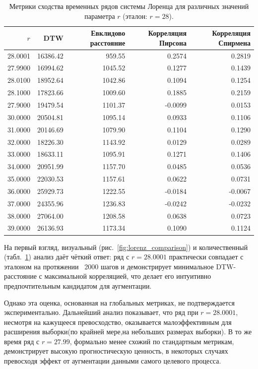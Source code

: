 \begin{table}[htbp]
\centering
\caption{Метрики сходства временных рядов системы Лоренца для различных значений параметра \(r\) (эталон: \(r=28\)).}
\label{tab:lorenz_metrics}
\begin{tabular}{|r|r|r|r|r|}
\hline
\(r\) & DTW & Евклидово расстояние & Корреляция Пирсона & Корреляция Спирмена \\
\hline
28.0001 & 16386.42 & 959.55 & 0.2574 & 0.2819 \\
\hline
27.9900 & 16994.62 & 1045.52 & 0.1277 & 0.1439 \\
\hline
28.0100 & 18952.64 & 1042.86 & 0.1094 & 0.1254 \\
\hline
28.1000 & 17823.66 & 1009.60 & 0.1885 & 0.2159 \\
\hline
27.9000 & 19479.54 & 1101.37 & -0.0099 & 0.0153 \\
\hline
30.0000 & 20504.81 & 1095.14 & 0.0933 & 0.1106 \\
\hline
31.0000 & 20146.69 & 1079.90 & 0.1104 & 0.1290 \\
\hline
32.0000 & 18226.30 & 1143.92 & 0.0129 & 0.0289 \\
\hline
33.0000 & 18633.11 & 1095.91 & 0.1271 & 0.1406 \\
\hline
34.0000 & 20951.99 & 1157.70 & 0.0485 & 0.0536 \\
\hline
35.0000 & 22030.53 & 1157.61 & 0.0622 & 0.0731 \\
\hline
36.0000 & 25929.73 & 1222.55 & -0.0184 & -0.0067 \\
\hline
37.0000 & 24355.96 & 1236.83 & -0.0242 & -0.0232 \\
\hline
38.0000 & 27064.00 & 1208.58 & 0.0638 & 0.0723 \\
\hline
39.0000 & 26136.93 & 1173.34 & 0.1090 & 0.1124 \\
\hline
\end{tabular}
\end{table}

На первый взгляд, визуальный (рис.~\ref{fig:lorenz_comparison}) и количественный 
(табл.~\ref{tab:lorenz_metrics}) анализ даёт чёткий ответ: ряд с \(r=28.0001\) практически
совпадает с эталоном на протяжении ~2000 шагов и демонстрирует минимальное DTW-расстояние
 с максимальной корреляцией, что делает его интуитивно предпочтительным кандидатом для аугментации.

Однако эта оценка, основанная на глобальных метриках, не подтверждается экспериментально.
 Дальнейший анализ показывает, что ряд при \(r=28.0001\), несмотря на кажущееся превосходство, 
 оказывается малоэффективным для расширения выборки(по крайней мере,на небольших размерах выборки).
  В то же время ряд с \(r=27.99\), формально 
 менее схожий по стандартным метрикам, демонстрирует высокую прогностическую ценность,
  в некоторых случаях превосходя эффект 
 от аугментации данными самого целевого процесса.


